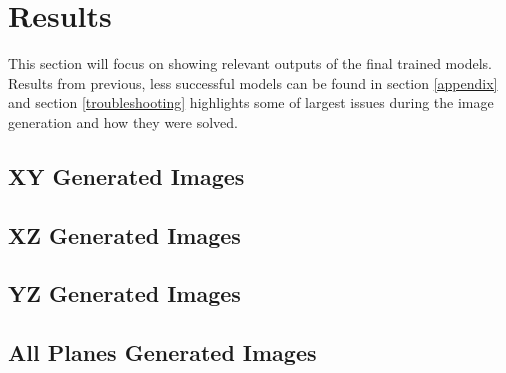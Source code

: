 \documentclass[12pt, fleqn, titlepage]{article}
\begin{document}
\section{Results}\label{results}

This section will focus on showing relevant outputs of the final trained models. Results from previous, less successful models can be found in section \ref{appendix} and section \ref{troubleshooting} highlights some of largest issues during the image generation and how they were solved.
\subsection{XY Generated Images}\label{xy_generated}


\subsection{XZ Generated Images}\label{xz_generated}


\subsection{YZ Generated Images}\label{yz_generated}


\subsection{All Planes Generated Images}\label{all_generated}
\end{document}
